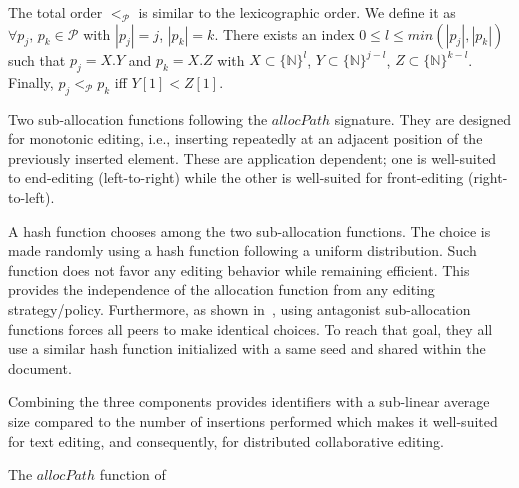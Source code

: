 \begin{asparadesc}
  
  The total order $<_{\mathcal{P}}$ is similar to the lexicographic order. We
  define it as $\forall p_j,\,p_k\in\mathcal{P}$ with $|p_j|=j$,
  $|p_k|=k$. There exists an index $0\leq l\leq min(|p_j|,|p_k|)$ such that
  $p_j = X.Y$ and $p_k = X.Z$ with $X\subset \{\mathbb{N}\}^l$,
  $Y \subset \{\mathbb{N}\}^{j-l}$, $Z \subset \{\mathbb{N}\}^{k-l}$. Finally,
  $p_j<_{\mathcal{P}}p_k$ iff $Y[1]<Z[1]$.
\item [Two sub-allocation functions] following the $allocPath$ signature. They
  are designed for monotonic editing, i.e., inserting repeatedly at an adjacent
  position of the previously inserted element. These are application dependent;
  one is well-suited to end-editing (left-to-right) while the other is
  well-suited for front-editing (right-to-left).
\item [A hash function] chooses among the two sub-allocation functions. The
  choice is made randomly using a hash function following a uniform
  distribution. Such function does not favor any editing behavior while
  remaining efficient. This provides the independence of the allocation function
  from any editing strategy/policy. Furthermore, as shown
  in~\cite{nedelec2013concurrency}, using antagonist sub-allocation functions
  forces all peers to make identical choices. To reach that goal, they all use a
  similar hash function initialized with a same seed and shared within the
  document.
\end{asparadesc}

Combining the three components provides identifiers with a sub-linear average
size compared to the number of insertions performed which makes it well-suited
for text editing, and consequently, for distributed collaborative editing.
  
  \begin{algorithm}[h]
    
    \caption{The $allocPath$ function of \LSEQ}
    \label{algo:allocpathalgo}
  \end{algorithm}

